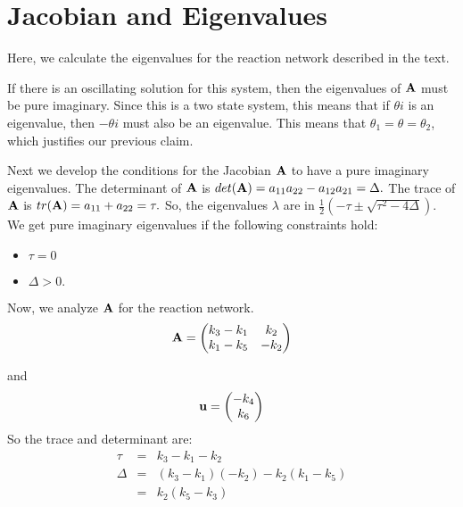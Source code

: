 \documentclass{bmcart}
\begin{document}
\section{Jacobian and Eigenvalues}
Here, we calculate the eigenvalues for the reaction network described
in the text.

If there is an oscillating solution for this system, then the
eigenvalues of ${\bf A}$ must be pure imaginary. Since this is a two
state system, this means that if $\theta i$ is an eigenvalue, then
$-\theta i$ must also be an eigenvalue. This means that
$\theta_1 = \theta = \theta_2$, which justifies our previous claim.

Next we develop the conditions for the Jacobian
${\bf A}$ to have a pure imaginary
eigenvalues. The determinant of ${\bf A}$ is
$det({\bf A}) = a_{11} a_{22} - a_{12} a_{21} = \Delta.$
The trace of
${\bf A}$ is $tr({\bf A}) = a_{11} + a_{22} = \tau.$
So, the eigenvalues $\lambda$ are in
$\frac{1}{2} \left( - \tau \pm \sqrt{\tau^2 - 4 \Delta} \right). $
We get pure imaginary eigenvalues 
if the following constraints hold:
\begin{itemize}
\item $\tau = 0$ 
\item $\Delta > 0.$
\end{itemize}

Now, we analyze ${\bf A}$ for the reaction network.
\begin{equation*}
{\bf A} =
\begin{pmatrix}
k_3 - k_1 & k_2 \\
k_1 - k_5 & -k_2 \\
\end{pmatrix}
\end{equation*}

and 
\begin{equation*}
{\bf u} = 
\begin{pmatrix} - k_4 \\ k_6 \\ \end{pmatrix}
\end{equation*}
So the trace and determinant are:
\begin{eqnarray*}
\tau & = & k_3 -k_1 - k_2 \\
\Delta & = & (k_3 - k_1)(-k_2) - k_2 (k_1 - k_5) \\
& = & k_2 (k_5 - k_3) \\
\end{eqnarray*}
\end{document}
